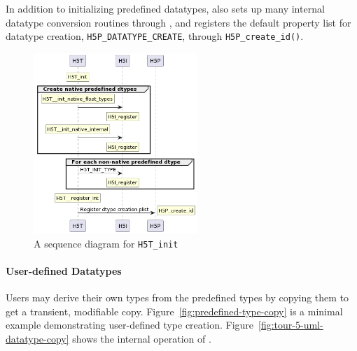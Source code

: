 In addition to initializing predefined datatypes,  also sets up many internal datatype conversion routines through , and registers the default property list for datatype creation, \texttt{H5P\_DATATYPE\_CREATE}, through \texttt{H5P\_create\_id()}.

\begin{figure}
\centering
\includegraphics[width=0.55\textwidth]{images/tour_5_uml_h5t_init.png}
\caption{A sequence diagram for \texttt{H5T\_init}}
\label{fig:h5t-init-table}
\end{figure}

\paragraph{User-defined Datatypes} Users may derive their own types from the predefined types by copying them to get a transient, modifiable copy. Figure~\ref{fig:predefined-type-copy} is a minimal example demonstrating user-defined type creation. Figure~\ref{fig:tour-5-uml-datatype-copy} shows the internal operation of .

